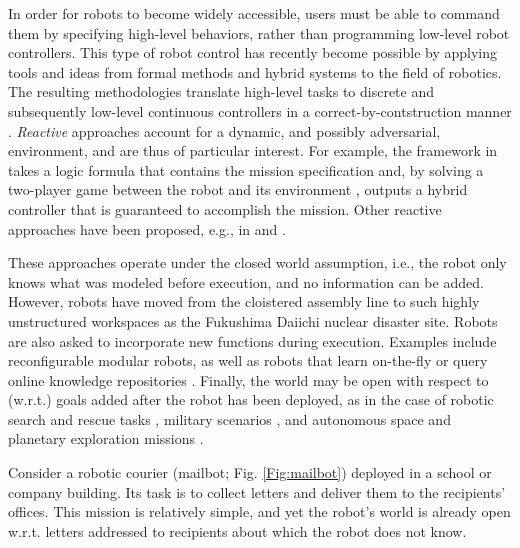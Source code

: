 In order for robots to become widely accessible, users must be able to command them by specifying high-level behaviors, rather than programming low-level robot controllers.
This type of robot control has recently become possible by applying tools and ideas from formal methods and hybrid systems to the field of robotics. The resulting methodologies translate high-level tasks to discrete and subsequently low-level continuous controllers in a correct-by-contstruction manner \cite{BBEFKP06, BhatiaRAM2011}.
\emph{Reactive} approaches account for a dynamic, and possibly adversarial, environment, and are thus of particular interest. For example, the framework in \cite{KGFP_TRO09} takes a logic formula that contains the mission specification and, by solving a two-player game between the robot and its environment \cite{piterman_06}, outputs a hybrid controller that is guaranteed to accomplish the mission. Other reactive approaches have been proposed, e.g., in \cite{Wongpiromsarn2010} and \cite{Belta2013RSS}.

These approaches operate under the closed world assumption, i.e., the robot only knows what was modeled before execution, and no information can be added. 
However, robots have moved from the cloistered assembly line to such highly unstructured workspaces as the Fukushima Daiichi nuclear disaster site. 
Robots are also asked to incorporate new functions during execution. 
Examples include reconfigurable modular robots, as well as robots that learn on-the-fly \cite{SaxenaIJRR2012} or query online knowledge repositories \cite{rapyuta2013}. 
Finally, the world may be open with respect to (w.r.t.) goals added after the robot has been deployed, as in the case of robotic search and rescue tasks \cite{MatthiasAI2010}, military scenarios \cite{gda2013}, and autonomous space and planetary exploration missions \cite{spaceXplore2006}. 

\begin{myExample}\label{Ex:mailbot1}
Consider a robotic courier (mailbot; Fig. \ref{Fig:mailbot}) deployed in a school or company building. 
Its task is to collect letters and deliver them to the recipients' offices. 
This mission is relatively simple, and yet the robot's world is already open w.r.t. letters addressed to recipients about which the robot does not know. %
\end{myExample}

